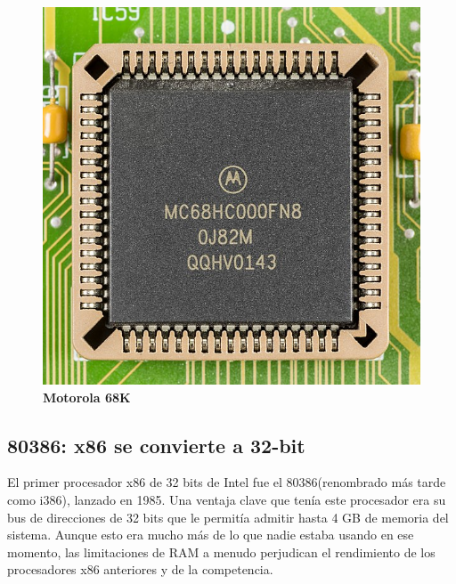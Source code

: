 \begin{figure}[htb]
	\centering
	\includegraphics[scale = 0.15]{Graphics/Motorola_MC68HC000FN8-0695.jpg}
	\caption{\textbf{Motorola 68K}}
	\label{fig:17}
\end{figure}

\subsection{80386: x86 se convierte a 32-bit}
El primer procesador x86 de 32 bits de Intel fue el 80386(renombrado más tarde como i386), lanzado en 1985. Una ventaja clave que tenía este procesador era su bus de 
direcciones de 32 bits que le permitía admitir hasta 4 GB de memoria del sistema. Aunque esto era mucho más de lo que nadie estaba 
usando en ese momento, las limitaciones de RAM a menudo perjudican el rendimiento de los procesadores x86 anteriores y de la competencia.

